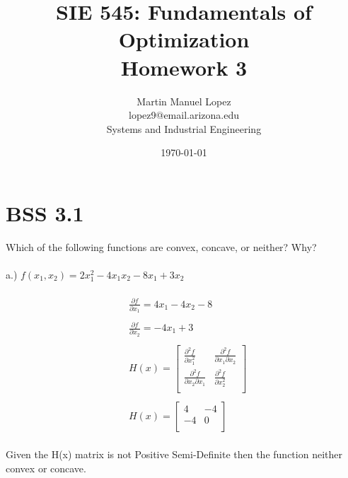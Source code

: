 \documentclass[12pt]{article}
\begin{document}
\title{SIE 545: Fundamentals of Optimization \\Homework 3}
\author{Martin Manuel Lopez \\lopez9@email.arizona.edu \\Systems and Industrial Engineering}
\date{\today}
\maketitle
\section{BSS 3.1}   
Which of the following functions are convex, concave, or neither? Why?\\ \\
a.) $f(x_1,x_2) = 2x_1^2 - 4x_1x_2 - 8x_1 + 3x_2$\\\\
\begin{align*}
    &\frac{\partial f}{\partial x_1} = 4x_1 - 4x_2 -8\\ \\
    &\frac{\partial f}{\partial x_2} = -4x_1 +3 \\ \\  
        &H(x) = 
        \begin{bmatrix}
          \frac{\partial^2 f}{\partial x_1^2} & \frac{\partial^2 f}{\partial x_1 \partial x_2} \\
          \frac{\partial^2 f}{\partial x_2 \partial x_1} & \frac{\partial^2 f}{\partial x_2^2} \\
        \end{bmatrix} \\ \\
    &H(x) = 
        \begin{bmatrix}
            4 & -4 \\
            -4 & 0 \\
        \end{bmatrix}
\end{align*}\\

Given the H(x) matrix is not Positive Semi-Definite then the function neither convex or concave. \\ \\
\end{document}
